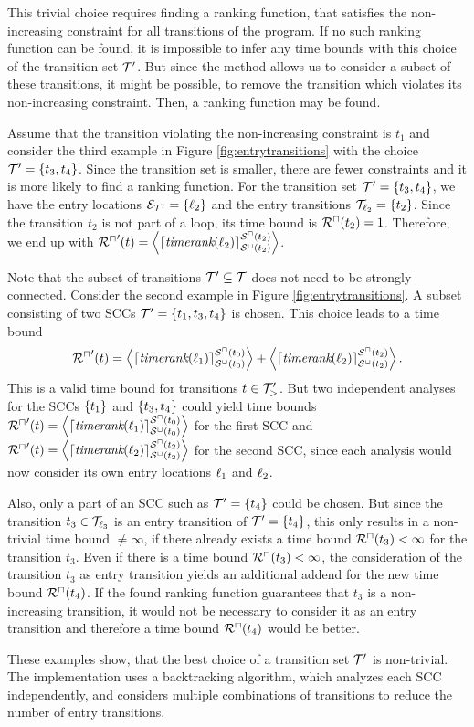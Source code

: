 This trivial choice requires finding a ranking function, that satisfies the non-increasing constraint for all transitions of the program.
If no such ranking function can be found, it is impossible to infer any time bounds with this choice of the transition set $\mathcal{T}'$.
But since the method allows us to consider a subset of these transitions, it might be possible, to remove the transition which violates its non-increasing constraint.
Then, a ranking function may be found.

Assume that the transition violating the non-increasing constraint is $t_1$ and consider the third example in Figure \ref{fig:entrytransitions} with the choice $\mathcal{T}' = \lbrace t_3, t_4 \rbrace$.
Since the transition set is smaller, there are fewer constraints and it is more likely to find a ranking function.
For the transition set $\mathcal{T}' = \lbrace t_3, t_4 \rbrace$, we have the entry locations $\mathcal{E}_{\mathcal{T}'} = \lbrace \ell_2 \rbrace$ and the entry transitions $\mathcal{T}_{\ell_2} = \lbrace t_2 \rbrace$.
Since the transition $t_2$ is not part of a loop, its time bound is ${\mathcal{R}^\sqcap}(t_2) = 1$.
Therefore, we end up with ${\mathcal{R}^\sqcap}'(t) = \left\langle \left\lceil \emph{timerank}(\ell_2) \right\rceil^{{\mathcal{S}^\sqcap}(t_2)}_{{\mathcal{S}^\sqcup}(t_2)} \right\rangle$.

Note that the subset of transitions $\mathcal{T}' \subseteq \mathcal{T}$ does not need to be strongly connected.
Consider the second example in Figure \ref{fig:entrytransitions}.
A subset consisting of two SCCs $\mathcal{T}' = \lbrace t_1, t_3, t_4 \rbrace$ is chosen.
This choice leads to a time bound \[ {\mathcal{R}^\sqcap}'(t) = \left\langle \left\lceil \emph{timerank}(\ell_1) \right\rceil^{{\mathcal{S}^\sqcap}(t_0)}_{{\mathcal{S}^\sqcup}(t_0)} \right\rangle + \left\langle \left\lceil \emph{timerank}(\ell_2) \right\rceil^{{\mathcal{S}^\sqcap}(t_2)}_{{\mathcal{S}^\sqcup}(t_2)} \right\rangle. \]
This is a valid time bound for transitions $t \in \mathcal{T}'_>$.
But two independent analyses for the SCCs $\lbrace t_1 \rbrace$ and $\lbrace t_3, t_4 \rbrace$ could yield time bounds ${\mathcal{R}^\sqcap}'(t) = \left\langle \left\lceil \emph{timerank}(\ell_1) \right\rceil^{{\mathcal{S}^\sqcap}(t_0)}_{{\mathcal{S}^\sqcup}(t_0)} \right\rangle$ for the first SCC and ${\mathcal{R}^\sqcap}'(t) = \left\langle \left\lceil \emph{timerank}(\ell_2) \right\rceil^{{\mathcal{S}^\sqcap}(t_2)}_{{\mathcal{S}^\sqcup}(t_2)} \right\rangle$ for the second SCC, since each analysis would now consider its own entry locations $\ell_1$ and $\ell_2$.

Also, only a part of an SCC such as $\mathcal{T}' = \lbrace t_4 \rbrace$ could be chosen.
But since the transition $t_3 \in \mathcal{T}_{\ell_3}$ is an entry transition of $\mathcal{T}' = \lbrace t_4 \rbrace$, this only results in a non-trivial time bound $\neq \infty$, if there already exists a time bound ${\mathcal{R}^\sqcap}(t_3) < \infty$ for the transition $t_3$.
Even if there is a time bound ${\mathcal{R}^\sqcap}(t_3) < \infty$, the consideration of the transition $t_3$ as entry transition yields an additional addend for the new time bound ${\mathcal{R}^\sqcap}(t_4)$.
If the found ranking function guarantees that $t_3$ is a non-increasing transition, it would not be necessary to consider it as an entry transition and therefore a time bound ${\mathcal{R}^\sqcap}(t_4)$ would be better.

These examples show, that the best choice of a transition set $\mathcal{T}'$ is non-trivial.
The implementation uses a backtracking algorithm, which analyzes each SCC independently, and considers multiple combinations of transitions to reduce the number of entry transitions.
